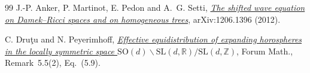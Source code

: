\documentclass[11pt,letterpaper]{article}
\numberwithin{equation}{section}
\begin{document}
\begin{thebibliography}{99}
 J.-P. Anker, P. Martinot, E. Pedon and A.~G. Setti, \href{https://arxiv.org/abs/1206.1396}{\emph{The shifted wave equation on Damek--Ricci spaces and on homogeneous trees}}, arXiv:1206.1396 (2012).

 C. Dru\c{t}u and N. Peyerimhoff, \href{https://doi.org/10.1515/forum-2024-0498}{\emph{Effective equidistribution of expanding horospheres in the locally symmetric space $\mathrm{SO}(d)\backslash\mathrm{SL}(d,\mathbb R)/\mathrm{SL}(d,\mathbb Z)$}}, Forum Math., Remark~5.5(2), Eq.~(5.9).

\end{thebibliography}
\endgroup
\end{document}
